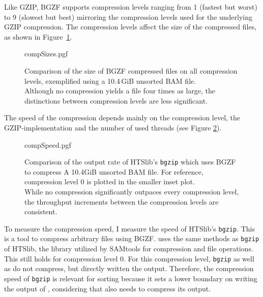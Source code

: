 Like GZIP, BGZF supports compression levels ranging from 1 (fastest but worst) to 9 (slowest but best) mirroring the compression levels used for the underlying GZIP compression. The compression levels affect the size of the compressed files, as shown in Figure~\ref{fig:compSizes}.
\begin{figure}[t]
        {compSizes.pgf}
    \caption{Comparison of the size of BGZF compressed files on all compression levels, exemplified using a 10.4\,GiB unsorted BAM file. \\
    Although no compression yields a file four times as large, the distinctions between compression levels are less significant.}
    \label{fig:compSizes}
\end{figure}
The speed of the compression depends mainly on the compression level, the GZIP-implementation and the number of used threads (see Figure \ref{fig:compSpeed}).  
\begin{figure}
        {compSpeed.pgf}
    \caption{Comparison of the output rate of HTSlib's \texttt{bgzip} which uses BGZF to compress A 10.4GiB unsorted BAM file. For reference, compression level 0 is plotted in the smaller inset plot. \\
    While no compression significantly outpaces every compression level, the throughput increments between the compression levels are consistent.}
    \label{fig:compSpeed}
\end{figure}
To measure the compression speed, I measure the speed of HTSlib's \texttt{bgzip}. This is a tool to compress arbitrary files using BGZF. \sort uses the same methods as \texttt{bgzip} of HTSlib, the library utilized by SAMtools for compression and file operations. This still holds for compression level 0. For this compression level, \texttt{bgzip} as well as \sort do not compress, but directly written the output. Therefore, the compression speed of \texttt{bgzip} is relevant for sorting because it sets a lower boundary on writing the output of \sort, considering that \sort also needs to compress its output.
